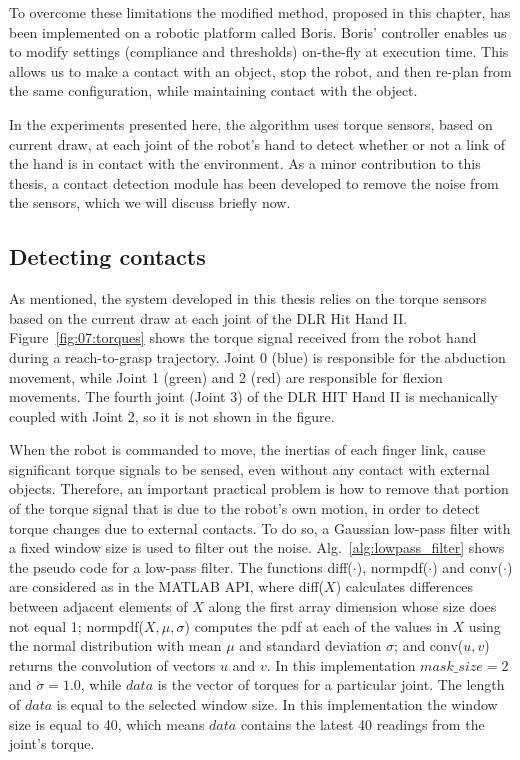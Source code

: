 To overcome these limitations the modified method, proposed in this chapter, has been implemented on a robotic platform called Boris. Boris' controller enables us to modify settings (compliance and thresholds) on-the-fly at execution time. This allows us to make a contact with an object, stop the robot, and then re-plan from the same configuration, while maintaining contact with the object.

In the experiments presented here, the algorithm uses torque sensors, based on current draw, at each joint of the robot's hand to detect whether or not a link of the hand is in contact with the environment. As a minor contribution to this thesis, a contact detection module has been developed to remove the noise from the sensors, which we will discuss briefly now.

\subsection{Detecting contacts}\label{sec:07:detecting_contacts}

As mentioned, the system developed in this thesis relies on the torque sensors based on the current draw at each joint of the DLR Hit Hand II. Figure~\ref{fig:07:torques} shows the torque signal received from the robot hand during a reach-to-grasp trajectory. Joint 0 (blue) is responsible for the abduction movement, while Joint 1 (green) and 2 (red) are responsible for flexion movements. The fourth joint (Joint 3) of the DLR HIT Hand II is mechanically coupled with Joint 2, so it is not shown in the figure. 

When the robot is commanded to move, the inertias of each finger link, cause significant torque signals to be sensed, even without any contact with external objects. Therefore, an important practical problem is how to remove that portion of the torque signal that is due to the robot's own motion, in order to detect torque changes due to external contacts. To do so, a Gaussian low-pass filter with a fixed window size is used to filter out the noise. Alg.~\ref{alg:lowpass_filter} shows the pseudo code for a low-pass filter. The functions diff($\cdot$), normpdf($\cdot$) and conv($\cdot$) are considered as in the MATLAB API, where diff($X$) calculates differences between adjacent elements of $X$ along the first array dimension whose size does not equal 1; normpdf($X,\mu,\sigma$) computes the pdf at each of the values in $X$ using the normal distribution with mean $\mu$ and standard deviation $\sigma$; and conv($u,v$) returns the convolution of vectors $u$ and $v$. In this implementation $mask\_size=2$ and $\sigma=1.0$, while $data$ is the vector of torques for a particular joint. The length of $data$ is equal to the selected window size. In this implementation the window size is equal to 40, which means $data$ contains the latest 40 readings from the joint's torque.  

